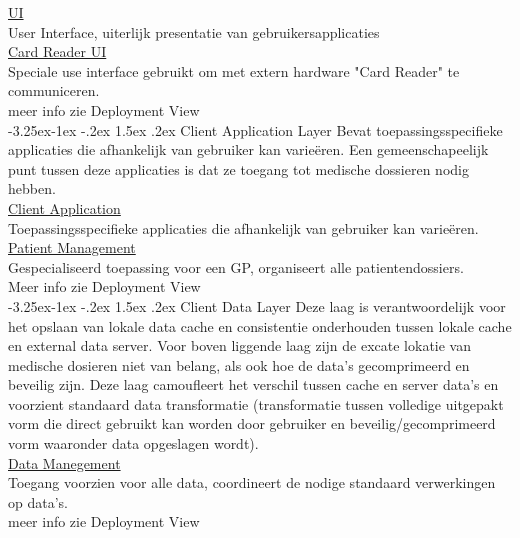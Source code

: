 \documentclass[a4paper,10pt]{article}
\makeatletter
\renewcommand\paragraph{\@startsection{paragraph}{4}{\z@}%
  {-3.25ex\@plus -1ex \@minus -.2ex}%
  {1.5ex \@plus .2ex}%
  {\normalfont\normalsize\bfseries}}
\makeatother
\begin{document}
\underline{UI}\\
User Interface, uiterlijk presentatie van gebruikersapplicaties\\

\underline{Card Reader UI}\\
Speciale use interface gebruikt om met extern hardware "Card Reader" te communiceren.\\
meer info zie Deployment View\\

\paragraph{Client Application Layer}
Bevat toepassingsspecifieke applicaties die afhankelijk van gebruiker kan varie\"{e}ren. Een gemeenschapeelijk punt tussen deze applicaties is dat ze toegang tot medische dossieren nodig hebben.
\\

\underline{Client Application}\\
Toepassingsspecifieke applicaties die afhankelijk van gebruiker kan varie\"{e}ren.\\

\underline{Patient Management}\\
Gespecialiseerd toepassing voor een GP, organiseert alle patientendossiers.\\
Meer info zie Deployment View\\

\paragraph{Client Data Layer}
Deze laag is verantwoordelijk voor het opslaan van lokale data cache en consistentie onderhouden tussen lokale cache en external data server.
Voor boven liggende laag zijn de excate lokatie van medische dosieren niet van belang, als ook hoe de data's gecomprimeerd en beveilig zijn. Deze laag camoufleert het verschil tussen cache en server data's en voorzient standaard data transformatie (transformatie tussen volledige uitgepakt vorm die direct gebruikt kan worden door gebruiker en beveilig/gecomprimeerd vorm waaronder data opgeslagen wordt).\\

\underline{Data Manegement}\\
Toegang voorzien voor alle data, coordineert de nodige standaard verwerkingen op data's.\\
meer info zie Deployment View\\
\end{document}
